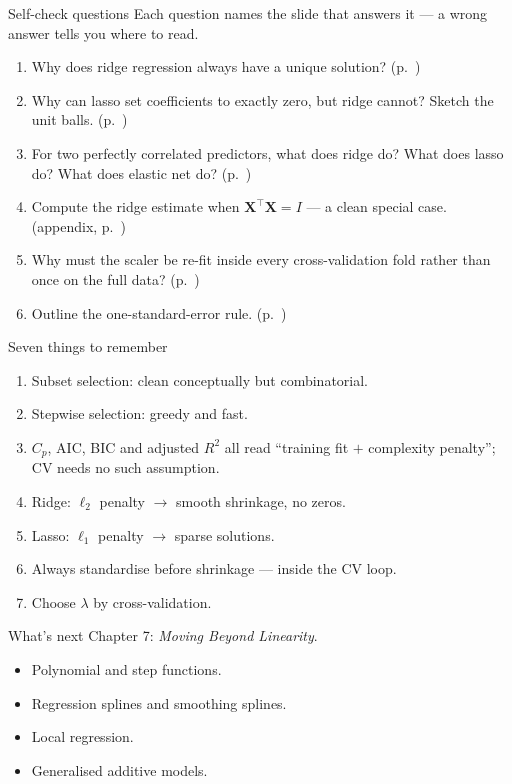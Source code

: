 \documentclass[aspectratio=169,11pt]{beamer}
\begin{document}
\begin{frame}{Self-check questions}
  Each question names the slide that answers it --- a wrong answer tells you
  where to read.
  \begin{enumerate}
    \item Why does ridge regression always have a unique solution?
          (p.~\pageref{frm:ridgeobj})
    \item Why can lasso set coefficients to exactly zero, but ridge
          cannot? Sketch the unit balls. (p.~\pageref{frm:lassogeom})
    \item For two perfectly correlated predictors, what does ridge do?
          What does lasso do? What does elastic net do? (p.~\pageref{frm:elastic})
    \item Compute the ridge estimate when $\mathbf{X}^\top\mathbf{X} = I$
          --- a clean special case. (appendix, p.~\pageref{frm:ee62})
    \item Why must the scaler be re-fit inside every cross-validation
          fold rather than once on the full data? (p.~\pageref{frm:labridge})
    \item Outline the one-standard-error rule. (p.~\pageref{frm:cvlambda})
  \end{enumerate}
\end{frame}

\begin{frame}{Seven things to remember}
  \begin{enumerate}
    \item Subset selection: clean conceptually but combinatorial.
    \item Stepwise selection: greedy and fast.
    \item $C_p$, AIC, BIC and adjusted $R^2$ all read ``training fit
          $+$ complexity penalty''; CV needs no such assumption.
    \item Ridge: $\ell_2$ penalty $\to$ smooth shrinkage, no zeros.
    \item Lasso: $\ell_1$ penalty $\to$ sparse solutions.
    \item Always standardise before shrinkage --- inside the CV loop.
    \item Choose $\lambda$ by cross-validation.
  \end{enumerate}
\end{frame}

\begin{frame}{What's next}
  Chapter 7: \emph{Moving Beyond Linearity}.
  \begin{itemize}
    \item Polynomial and step functions.
    \item Regression splines and smoothing splines.
    \item Local regression.
    \item Generalised additive models.
  \end{itemize}
\end{frame}
\end{document}
